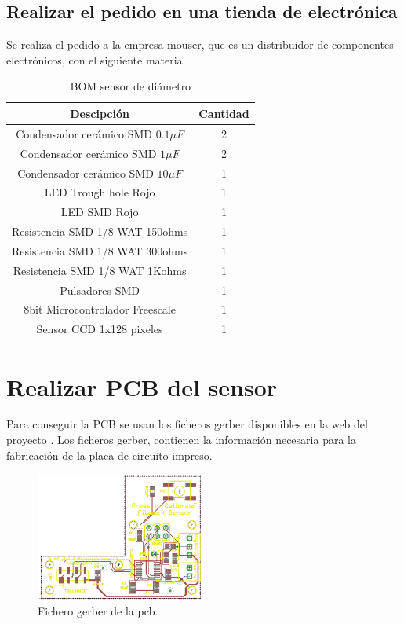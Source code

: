 \subsection{Realizar el pedido en una tienda de electrónica}

Se realiza el pedido a la empresa mouser, que es un distribuidor de componentes electrónicos, con el siguiente material.

\begin{table}[H]
\centering
\begin{tabular}{cc}
{\bf Descipción}                 & {\bf Cantidad} \\ \hline
Condensador cerámico SMD $0.1 \mu F$ & 2              \\
Condensador cerámico SMD $1 \mu F$   & 2              \\
Condensador cerámico SMD $10 \mu F$  & 1              \\
LED Trough hole Rojo             & 1              \\
LED SMD Rojo                     & 1              \\
Resistencia SMD 1/8 WAT 150ohms  & 1              \\
Resistencia SMD 1/8 WAT 300ohms  & 1              \\
Resistencia SMD 1/8 WAT 1Kohms   & 1              \\
Pulsadores SMD                   & 1              \\
8bit Microcontrolador Freescale  & 1              \\
Sensor CCD 1x128 pixeles         & 1             
\end{tabular}
\caption{BOM sensor de diámetro}
\label{tab:BOM}
\end{table}

\section{Realizar PCB del sensor}

Para conseguir la PCB se usan los ficheros gerber disponibles en la web del proyecto \cite{thing_filamento}. Los ficheros gerber, contienen la información necesaria para la fabricación de la placa de circuito impreso.

   \begin{figure}[H]
            \centering
            \includegraphics[width=0.5\textwidth]{images/sensor/gerber.png}
            \caption{Fichero gerber de la pcb.}
            \label{fig:sens_gerber}
    \end{figure}



